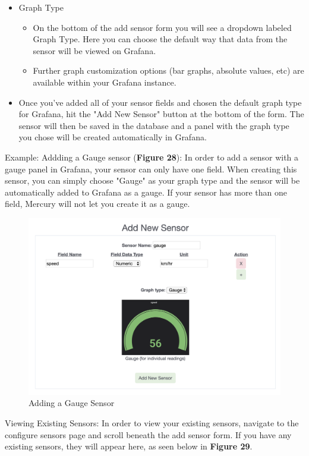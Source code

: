 \documentclass[12pt, letterpaper]{article}
\begin{document}
{{{{{{{{{{{\begin{itemize}
\begin{itemize}
\begin{itemize}
		\end{itemize}
	\end{itemize}
	\item Graph Type
	\begin{itemize}
		\item On the bottom of the add sensor form you will see a dropdown labeled Graph Type. Here you can choose the default way that data from the sensor will be viewed on Grafana.
		\item Further graph customization options (bar graphs, absolute values, etc) are available within your Grafana instance.
	\end{itemize}
	\item Once you've added all of your sensor fields and chosen the default graph type for Grafana, hit the "Add New Sensor" button at the bottom of the form. The sensor will then be saved in the database and a panel with the graph type you chose will be created automatically in Grafana.
\end{itemize}
\newpage \par Example: Addding a Gauge sensor (\textbf{Figure 28}): In order to add a sensor with a gauge panel in Grafana, your sensor can only have one field. When creating this sensor, you can simply choose "Gauge" as your graph type and the sensor will be automatically added to Grafana as a gauge. If your sensor has more than one field, Mercury will not let you create it as a gauge.
\begin{figure}[h!]
	\centering
	\includegraphics[width=1\columnwidth]{assets/add_sensor_gauge.png}
	\caption{Adding a Gauge Sensor}
	\end{figure}	
\par Viewing Existing Sensors: In order to view your existing sensors, navigate to the configure sensors page and scroll beneath the add sensor form. If you have any existing sensors, they will appear here, as seen below in \textbf{Figure 29}.
}}}}}}}}}}}
\end{document}

